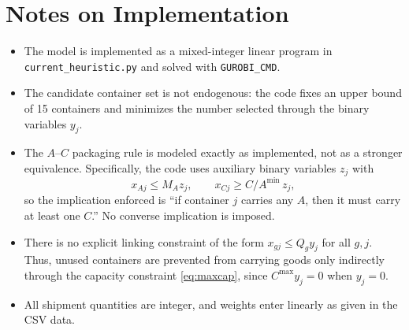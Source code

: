 \section*{Notes on Implementation}

\begin{itemize}
    \item The model is implemented as a mixed-integer linear program in \texttt{current\_heuristic.py} and solved with \texttt{GUROBI\_CMD}.
    \item The candidate container set is not endogenous: the code fixes an upper bound of 15 containers and minimizes the number selected through the binary variables $y_j$.
    \item The $A$--$C$ packaging rule is modeled exactly as implemented, not as a stronger equivalence. Specifically, the code uses auxiliary binary variables $z_j$ with
    \[
    x_{A j}\le M_A z_j,\qquad x_{C j}\ge C/A^{\min}\, z_j,
    \]
    so the implication enforced is ``if container $j$ carries any $A$, then it must carry at least one $C$.'' No converse implication is imposed.
    \item There is no explicit linking constraint of the form $x_{g j}\le Q_g y_j$ for all $g,j$. Thus, unused containers are prevented from carrying goods only indirectly through the capacity constraint \eqref{eq:maxcap}, since $C^{\max}y_j=0$ when $y_j=0$.
    \item All shipment quantities are integer, and weights enter linearly as given in the CSV data.
\end{itemize}
